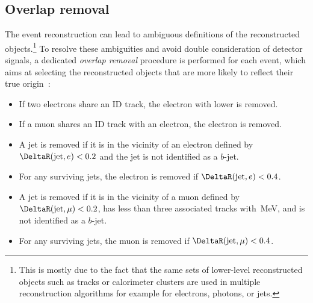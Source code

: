 \subsection{Overlap removal}
\label{subsec:overlap-removal}

The event reconstruction can lead to ambiguous definitions of the reconstructed objects.\footnote{This is mostly due to the fact that the same sets of lower-level reconstructed objects such as tracks or calorimeter clusters are used in multiple reconstruction algorithms for example for electrons, photons, or jets.}
To resolve these ambiguities and avoid double consideration of detector signals, a dedicated \emph{overlap removal} procedure is performed for each event, which aims at selecting the reconstructed objects that are more likely to reflect their true origin~\cite{HWWPaper}:
\begin{itemize}
    \item If two electrons share an ID track, the electron with lower \ET is removed.
    \item If a muon shares an ID track with an electron, the electron is removed.
    \item A jet is removed if it is in the vicinity of an electron defined by $\DeltaR(\text{jet}, e) < 0.2$ and the jet is not identified as a $b$-jet.
    \item For any surviving jets, the electron is removed if $\DeltaR(\text{jet}, e) < 0.4$.
    \item A jet is removed if it is in the vicinity of a muon defined by $\DeltaR(\text{jet}, \mu) < 0.2$, has less than three associated tracks with \,MeV, and is not identified as a $b$-jet.
    \item For any surviving jets, the muon is removed if $\DeltaR(\text{jet}, \mu) < 0.4$.
\end{itemize}


